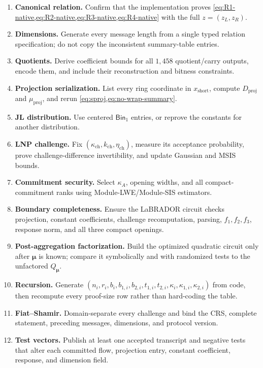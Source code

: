 \documentclass[11pt,a4paper]{article}
\newcommand{\Bin}{\mathsf{Bin}}
\begin{document}
\begin{enumerate}
  \item \textbf{Canonical relation.} Confirm that the implementation proves
  \cref{eq:R1-native,eq:R2-native,eq:R3-native,eq:R4-native} with the full
  \(z=(z_L,z_R)\).
  \item \textbf{Dimensions.} Generate every message length from a single typed
  relation specification; do not copy the inconsistent summary-table entries.
  \item \textbf{Quotients.} Derive coefficient bounds for all \(1{,}458\)
  quotient/carry outputs, encode them, and include their reconstruction and
  bitness constraints.
  \item \textbf{Projection serialization.} List every ring coordinate in
  \(x_{\mathrm{short}}\), compute \(D_{\mathrm{proj}}\) and
  \(\mu_{\mathrm{proj}}\), and rerun \cref{eq:sproj,eq:no-wrap-summary}.
  \item \textbf{JL distribution.} Use centered \(\Bin_1\) entries, or reprove
  the constants for another distribution.
  \item \textbf{LNP challenge.} Fix
  \((\kappa_{\mathrm{ch}},k_{\mathrm{ch}},\eta_{\mathrm{ch}})\), measure its
  acceptance probability, prove challenge-difference invertibility, and update
  Gaussian and MSIS bounds.
  \item \textbf{Commitment security.} Select \(\kappa_A\), opening widths, and
  all compact-commitment ranks using Module-LWE/Module-SIS estimators.
  \item \textbf{Boundary completeness.} Ensure the LaBRADOR circuit checks
  projection, constant coefficients, challenge recomputation, parsing,
  \(f_1,f_2,f_3\), response norm, and all three compact openings.
  \item \textbf{Post-aggregation factorization.} Build the optimized quadratic
  circuit only after \(\boldsymbol\mu\) is known; compare it symbolically and
  with randomized tests to the unfactored \(Q_{\boldsymbol\mu}\).
  \item \textbf{Recursion.} Generate \((n_i,r_i,b_i,b_{1,i},b_{2,i},t_{1,i},
  t_{2,i},\kappa_i,\kappa_{1,i},\kappa_{2,i})\) from code, then recompute every
  proof-size row rather than hard-coding the table.
  \item \textbf{Fiat--Shamir.} Domain-separate every challenge and bind the CRS,
  complete statement, preceding messages, dimensions, and protocol version.
  \item \textbf{Test vectors.} Publish at least one accepted transcript and
  negative tests that alter each committed flow, projection entry, constant
  coefficient, response, and dimension field.
\end{enumerate}
\end{document}
